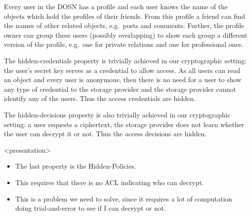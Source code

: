 Every user in the \ac{DOSN} has a profile and each user knows the name of the 
objects which hold the profiles of their friends.
From this profile a friend can find the names of other related objects, 
e.g.~posts and comments.
Further, the profile owner can group these users (possibly overlapping) to show 
each group a different version of the profile, e.g.~one for private relations 
and one for professional ones.

%
%
%
%

The hidden-credentials property is trivially achieved in our cryptographic 
setting: the user's secret key serves as a credential to allow access.
As all users can read an object and every user is anonymous, then there is no 
need for a user to show any type of credential to the storage provider and the 
storage provider cannot identify any of the users.
Thus the access credentials are hidden.

%
%
%
%

The hidden-decisions property is also trivially achieved in our cryptographic 
setting: a user requests a ciphertext, the storage provider does not learn 
whether the user can decrypt it or not.
Thus the access decisions are hidden.

\begin{frame}<presentation>
  \begin{itemize}

    \item The last property is the Hidden-Policies.
      
    \item This requires that there is no \ac{ACL} indicating who can decrypt.

    \item This is a problem we need to solve, since it requires a lot of 
      computation doing trial-and-error to see if I can decrypt or not.

  \end{itemize}
\end{frame}

